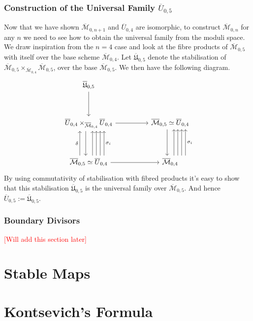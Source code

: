 \subsubsection{Construction of the Universal Family $\overline{U}_{0,5}$}
Now that we have shown $\overline{\mathcal{M}}_{0,n+1}$ and $\overline{U}_{0,4}$ are isomorphic, to construct $\overline{\mathcal{M}}_{0,n}$ for any $n$ we need to see how to obtain the universal family from the moduli space.
We draw inspiration from the $n=4$ case and look at the fibre products of $\overline{\mathcal{M}}_{0,5}$ with itself over the base scheme $\overline{\mathcal{M}}_{0,4}$.
Let $\overline{\mathfrak{U}}_{0,5}$ denote the stabilisation of $\overline{\mathcal{M}}_{0,5} \times_{\overline{\mathcal{M}}_{0,4}} \overline{\mathcal{M}}_{0,5}$, over the base $\overline{\mathcal{M}}_{0,5}$. 
We then have the following diagram.
\[
\begin{tikzcd}
    \overline{\mathfrak{U}}_{0,5} & & \\
    \\
    \overline{U}_{0,4} \times_{\overline{\mathcal{M}}_{0,4}} \overline{U}_{0,4} & & \overline{\mathcal{M}}_{0,5} \simeq \overline{U}_{0,4} \\
    \\
    \overline{\mathcal{M}}_{0,5} \simeq \overline{U}_{0,4} & & \overline{\mathcal{M}}_{0,4}
    \arrow[from = 1-1, to = 3-1]
    \arrow[from = 3-1, to = 3-3]
    \arrow[from = 3-1, to = 5-1, xshift = -1ex]
    \arrow[from = 5-1, to = 5-3]
    \arrow[from = 3-3, to = 5-3, xshift = -1ex]
    \arrow[from = 5-1, to = 3-1, xshift = 1.3ex]
    \arrow[from = 5-1, to = 3-1, xshift = 2.6ex]
    \arrow[from = 5-1, to = 3-1, xshift = 3.9ex]
    \arrow[swap, "\sigma_{i}",from = 5-1, to = 3-1, xshift = 5.2ex]
    \arrow["\delta", from = 5-1, to = 3-1, xshift = -3ex]
    \arrow[from = 5-3, to = 3-3, xshift = 1.3ex]
    \arrow[from = 5-3, to = 3-3, xshift = 2.6ex]
    \arrow[from = 5-3, to = 3-3, xshift = 3.9ex]
    \arrow[swap, "\sigma_{i}",from = 5-3, to = 3-3, xshift = 5.2ex]
\end{tikzcd}
\]
By using commutativity of stabilisation with fibred products it's easy to show that this stabilisation $\overline{\mathfrak{U}}_{0,5}$ is the universal family over $\overline{\mathcal{M}}_{0,5}$.
And hence $\overline{U}_{0,5}:=\overline{\mathfrak{U}}_{0,5}$.
\subsubsection{Boundary Divisors}
\textcolor{red}{[Will add this section later]}
\section{Stable Maps}
\section{Kontsevich's Formula}
